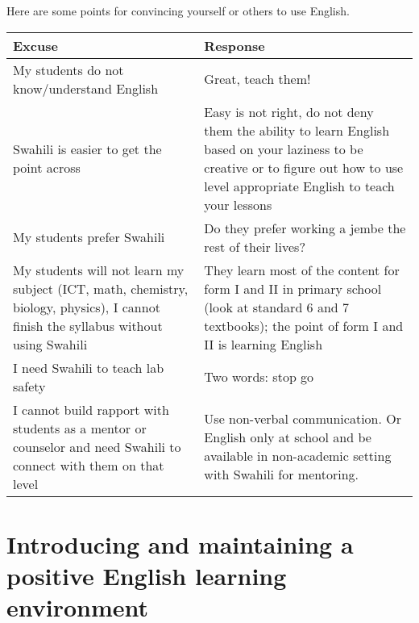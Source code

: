 Here are some points for convincing yourself or others to use English.

\begin{tabular}{|>{\raggedright}p{5cm}||>{\raggedright}p{8cm}|}
\hline 
Excuse & Response\tabularnewline
\hline 
\hline 
My students do not know/understand English & Great, teach them!\tabularnewline
\hline 
\hline 
Swahili is easier to get the point across & Easy is not right, do not deny them the ability to learn English based
on your laziness to be creative or to figure out how to use level
appropriate English to teach your lessons\tabularnewline
\hline 
\hline 
My students prefer Swahili & Do they prefer working a jembe the rest of their lives? \tabularnewline
\hline 
\hline 
My students will not learn my subject (ICT, math, chemistry, biology,
physics), I cannot finish the syllabus without using Swahili & They learn most of the content for form I and II in primary school
(look at standard 6 and 7 textbooks); the point of form I and II is
learning English\tabularnewline
\hline 
\hline 
I need Swahili to teach lab safety & Two words: \textquotedbl{}stop\textquotedbl{} \textquotedbl{}go\textquotedbl{}\tabularnewline
\hline 
\hline 
I cannot build rapport with students as a mentor or counselor and
need Swahili to connect with them on that level & Use non-verbal communication. Or English only at school and be available
in non-academic setting with Swahili for mentoring.\tabularnewline
\hline 
\end{tabular}


\section{Introducing and maintaining a positive English learning environment}

